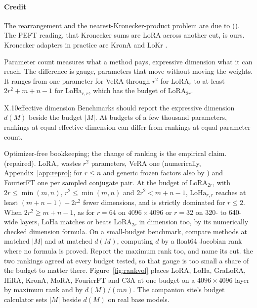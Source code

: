 \paragraph{Credit}
The rearrangement and the nearest-Kronecker-product problem are due to \citet{loan1993approximation} (). The
PEFT reading, that Kronecker sums are LoRA across another cut, is ours. Kronecker adapters in practice are KronA
\citep{edalati2022krona} and LoKr \citep{yeh2023navigating}.

Parameter count measures what a method pays, expressive dimension what it can reach. The difference is gauge, parameters
that move without moving the weights. It ranges from one parameter for VeRA through $r^2$ for $\mathrm{LoRA}_r$ to at
least $2r^2+m+n-1$ for $\mathrm{LoHa}_{r,r}$, which has the budget of $\mathrm{LoRA}_{2r}$.

\begin{prediction}{X.10}{effective dimension}
Benchmarks should report the expressive dimension $d(M)$ beside the budget $\lvert M\rvert$. At budgets of a few thousand
parameters, rankings at equal effective dimension can differ from rankings at equal parameter count.
\begin{predmeta}
   Optimizer-free bookkeeping; the change of ranking is the empirical claim.
    (repaired). $\mathrm{LoRA}_r$ wastes $r^2$ parameters, VeRA
    \citep{kopiczko2023vera} one (numerically, Appendix~\ref{app:repro}; for $r\le n$ and generic frozen factors also
    by ) and FourierFT one per sampled conjugate pair. At the budget of $\mathrm{LoRA}_{2r}$, with
    $2r\le\min(m,n)$, $r^2\le\min(m,n)$ and $2r^2<m+n-1$, $\mathrm{LoHa}_{r,r}$ reaches at least $(m+n-1)-2r^2$ fewer
    dimensions, and is strictly dominated for $r\le2$. When $2r^2\ge m+n-1$, as for $r=64$ on $4096\times4096$ or $r=32$
    on 320- to 640-wide layers, LoHa matches or beats $\mathrm{LoRA}_{2r}$ in dimension too, by its numerically checked
    dimension formula.
   On a small-budget benchmark, compare methods at matched $\lvert M\rvert$ and at matched $d(M)$,
    computing $d$ by a float64 Jacobian rank where no formula is proved. Report the maximum rank too, and name its cut.
   the two rankings agreed at every budget tested, so that gauge is too small a share of the
    budget to matter there.
   Figure~\ref{fig:rankvol} places LoRA, LoHa, GraLoRA, HiRA, KronA, MoRA, FourierFT and C3A at one
    budget on a $4096\times4096$ layer by maximum rank and by $d(M)/(mn)$. The companion site's budget calculator sets
    $\lvert M\rvert$ beside $d(M)$ on real base models.
\end{predmeta}
\end{prediction}


